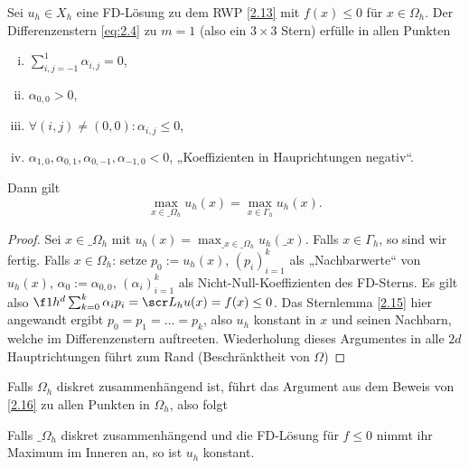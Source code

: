 \begin{st} \label{2.16}
	Sei $u_h \in X_h$ eine FD-Lösung zu dem RWP \ref{2.13} mit $f(x) \le 0$ für $x \in \Omega_h$.
	Der Differenzenstern \eqref{eq:2.4} zu $m = 1$ (also ein $3\times 3$ Stern) erfülle in allen Punkten
	\begin{enumerate}[i)]
		\item
			$\sum_{i,j=-1}^1 \alpha_{i,j} = 0$,
		\item
			$\alpha_{0,0} > 0$,
		\item
			$\forall (i,j) \neq (0,0) : \alpha_{i,j} \le 0$,
		\item
			$\alpha_{1,0}, \alpha_{0,1}, \alpha_{0,-1}, \alpha_{-1,0} < 0$, „Koeffizienten in Hauprichtungen negativ“.
	\end{enumerate}
	Dann gilt
	\[
		\max_{x\in\_\Omega_h} u_h(x) = \max_{x\in \Gamma_h} u_h(x).
	\]
	\begin{proof}
		Sei $x \in \_\Omega_h$ mit $u_h(x) = \max_{\_x\in \_\Omega_h} u_h (\_x)$.
		Falls $x \in \Gamma_h$, so sind wir fertig.
		Falls $x \in \Omega_h$: setze $p_0 := u_h(x)$, $(p_i)_{i=1}^k$ als „Nachbarwerte“ von $u_h(x)$, $\alpha_0 := \alpha_{0,0}$, $(\alpha_i)_{i=1}^k$ als Nicht-Null-Koeffizienten des FD-Sterns.
		Es gilt also $\f 1{h^d} \sum_{k=0}^k \alpha_i p_i = \scr L_h u(x) = f(x) \le 0$.
		Das Sternlemma \ref{2.15} hier angewandt ergibt $p_0 = p_1 = \dotsc = p_k$, also $u_h$ konstant in $x$ und seinen Nachbarn, welche im Differenzenstern auftreeten.
		Wiederholung dieses Argumentes in alle $2d$ Hauptrichtungen führt zum Rand (Beschränktheit von $\Omega$)
	\end{proof}
\end{st}

Falls $\Omega_h$ diskret zusammenhängend ist, führt das Argument aus dem Beweis von \ref{2.16} zu allen Punkten in $\Omega_h$, also folgt

\begin{kor} \label{2.17}
	Falls $\_\Omega_h$ diskret zusammenhängend und die FD-Lösung für $f \le 0$ nimmt ihr Maximum im Inneren an, so ist $u_h$ konstant.
\end{kor}

